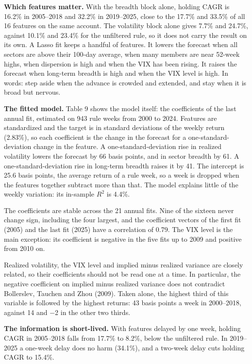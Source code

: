 \documentclass[11pt]{article}
\begin{document}
\textbf{Which features matter.} With the breadth block alone, holding CAGR is 16.2\% in 2005--2018 and 32.2\% in 2019--2025, close to the 17.7\% and 33.5\% of all 16 features on the same account. The volatility block alone gives 7.7\% and 24.7\%, against 10.1\% and 23.4\% for the unfiltered rule, so it does not carry the result on its own. A Lasso fit keeps a handful of features. It lowers the forecast when all sectors are above their 100-day average, when many members are near 52-week highs, when dispersion is high and when the VIX has been rising. It raises the forecast when long-term breadth is high and when the VIX level is high. In words: step aside when the advance is crowded and extended, and stay when it is broad but nervous.

\textbf{The fitted model.} Table 9 shows the model itself: the coefficients of the last annual fit, estimated on 943 rule weeks from 2000 to 2024. Features are standardized and the target is in standard deviations of the weekly return (2.83\%), so each coefficient is the change in the forecast for a one-standard-deviation change in the feature. A one-standard-deviation rise in realized volatility lowers the forecast by 66 basis points, and in sector breadth by 61. A one-standard-deviation rise in long-term breadth raises it by 41. The intercept is 25.6 basis points, the average return of a rule week, so a week is dropped when the features together subtract more than that. The model explains little of the weekly variation: its in-sample \(R^2\) is 4.4\%.

The coefficients are stable across the 21 annual fits. Nine of the sixteen never change sign, including the four largest, and the coefficient vectors of the first fit (2005) and the last fit (2025) have a correlation of 0.79. The VIX level is the main exception: its coefficient is negative in the five fits up to 2009 and positive from 2010 on.

Realized volatility, the VIX level and implied minus realized variance are closely related, so their coefficients should not be read one at a time. In particular, the negative coefficient on implied minus realized variance does not contradict Bollerslev, Tauchen and Zhou (2009). Taken alone, the highest third of this variable is followed by the highest returns: 43 basis points a week in 2000--2018, against 14 and $-$2 in the other two thirds.

\textbf{The information is short-lived.} With features delayed by one week, holding CAGR in 2005--2018 falls from 17.7\% to 8.2\%, below the unfiltered rule. In 2019--2025 a one-week delay does no harm (34.1\%), and a two-week delay cuts holding CAGR to 15.4\%.
\end{document}
